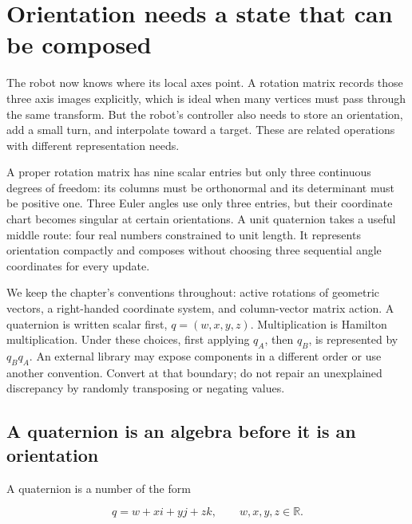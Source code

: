 \section{Orientation needs a state that can be composed}\label{01-foundations-i-ch019-orientation-needs-a-state-that-can-be-composed}

\hypertarget{01-foundations-i-ch019-orientation-needs-a-state-that-can-be-composed}{}

The robot now knows where its local axes point. A rotation matrix records those three axis images explicitly, which is ideal when many vertices must pass through the same transform. But the robot's controller also needs to store an orientation, add a small turn, and interpolate toward a target. These are related operations with different representation needs.

A proper rotation matrix has nine scalar entries but only three continuous degrees of freedom: its columns must be orthonormal and its determinant must be positive one. Three Euler angles use only three entries, but their coordinate chart becomes singular at certain orientations. A unit quaternion takes a useful middle route: four real numbers constrained to unit length. It represents orientation compactly and composes without choosing three sequential angle coordinates for every update.

We keep the chapter's conventions throughout: active rotations of geometric vectors, a right-handed coordinate system, and column-vector matrix action. A quaternion is written scalar first, \(q=(w,x,y,z)\). Multiplication is Hamilton multiplication. Under these choices, first applying \(q_A\), then \(q_B\), is represented by \(q_Bq_A\). An external library may expose components in a different order or use another convention. Convert at that boundary; do not repair an unexplained discrepancy by randomly transposing or negating values.

\subsection{A quaternion is an algebra before it is an orientation}\label{01-foundations-i-ch019-a-quaternion-is-an-algebra-before-it-is-an-orientation}

\hypertarget{01-foundations-i-ch019-a-quaternion-is-an-algebra-before-it-is-an-orientation}{}

A quaternion is a number of the form

\[
q=w+xi+yj+zk,
\qquad w,x,y,z\in\mathbb R.
\]

